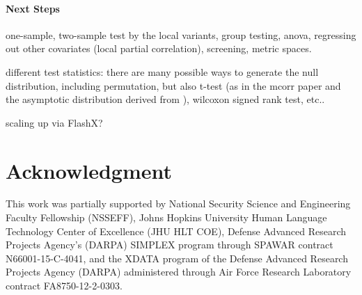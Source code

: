 \documentclass[11pt]{article}
\newcommand{\jv}[1]{{\color{red}{#1}}}
\newcommand{\cs}[1]{{\color{blue}{#1}}}
\begin{document}
\cs{I feel it is not necessary to include next steps in the paper. For example, although the idea to extend two-sample test by local variant is similar to MGC, we shouldn't be too optimistic in this paper before we tried them; also if it does work, probably we don't want to tell others yet :-)}
\jv{good paper writing essentially requires next steps.  it tells people how our work changes the world, what can be achieved next, and in particular, which subset of those things we are planning on doing.}
\cs{I have added sub-sampling stuff into intro part as well as appendix. Other than that, I cannot think of any potential stuff that is concrete enough to add; and the current applications are already wonderful enough! }

\paragraph{Next Steps}



one-sample, two-sample test by the local variants, group testing, anova, regressing out other covariates (local partial correlation), screening, metric spaces.

different test statistics: there are many possible ways to generate the null distribution, including permutation, but also t-test (as in the mcorr paper \cite{SzekelyRizzo2013a} and the asymptotic distribution derived from \cite{GrettonEtAl2012}), wilcoxon signed rank test, etc..

scaling up via FlashX?

\section*{Acknowledgment}
This work was partially supported by 
% 
National Security Science and Engineering Faculty Fellowship (NSSEFF), 
% 
Johns Hopkins University Human Language Technology Center of Excellence (JHU HLT COE), 
% 
Defense Advanced Research Projects Agency's (DARPA) SIMPLEX program through SPAWAR contract N66001-15-C-4041, 
% 
and the XDATA program of the Defense Advanced Research Projects Agency (DARPA) administered through Air Force Research Laboratory contract FA8750-12-2-0303.



\appendix
\setcounter{figure}{0}
\renewcommand\thefigure{\arabic{figure}} 
\end{document}
